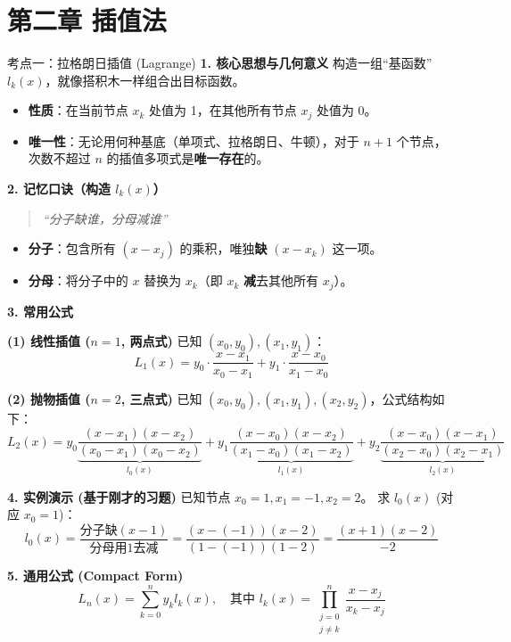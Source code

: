 \documentclass[12pt, a4paper]{article}
\begin{document}
\section*{第二章 插值法}
\begin{knowpoint}{考点一：拉格朗日插值 (Lagrange)}
    \textbf{1. 核心思想与几何意义}
    构造一组“基函数” $l_k(x)$，就像搭积木一样组合出目标函数。
    \begin{itemize}
        \item \textbf{性质}：在当前节点 $x_k$ 处值为 1，在其他所有节点 $x_j$ 处值为 0。
        \item \textbf{唯一性}：无论用何种基底（单项式、拉格朗日、牛顿），对于 $n+1$ 个节点，次数不超过 $n$ 的插值多项式是\textbf{唯一存在}的。
    \end{itemize}
    
    \textbf{2. 记忆口诀（构造 $l_k(x)$）}
    \begin{quote}
        \textit{“分子缺谁，分母减谁”}
    \end{quote}
    \begin{itemize}
        \item \textbf{分子}：包含所有 $(x - x_j)$ 的乘积，唯独\textbf{缺} $(x - x_k)$ 这一项。
        \item \textbf{分母}：将分子中的 $x$ 替换为 $x_k$（即 $x_k$ \textbf{减}去其他所有 $x_j$）。
    \end{itemize}
    
    \textbf{3. 常用公式}
    
    \textbf{(1) 线性插值 ($n=1$, 两点式)}
    已知 $(x_0, y_0), (x_1, y_1)$：
    \[ L_1(x) = y_0 \cdot \frac{x - x_1}{x_0 - x_1} + y_1 \cdot \frac{x - x_0}{x_1 - x_0} \]
    
    \textbf{(2) 抛物插值 ($n=2$, 三点式)}
    已知 $(x_0, y_0), (x_1, y_1), (x_2, y_2)$，公式结构如下：
    \[ 
    L_2(x) = y_0 \underbrace{\frac{(x-x_1)(x-x_2)}{(x_0-x_1)(x_0-x_2)}}_{l_0(x)} + 
             y_1 \underbrace{\frac{(x-x_0)(x-x_2)}{(x_1-x_0)(x_1-x_2)}}_{l_1(x)} + 
             y_2 \underbrace{\frac{(x-x_0)(x-x_1)}{(x_2-x_0)(x_2-x_1)}}_{l_2(x)}
    \]
    
    \textbf{4. 实例演示 (基于刚才的习题)}
    已知节点 $x_0=1, x_1=-1, x_2=2$。
    求 $l_0(x)$ (对应 $x_0=1$)：
    \[ 
    l_0(x) = \frac{\text{分子缺}(x-1)}{\text{分母用}1\text{去减}} = \frac{(x - (-1))(x - 2)}{(1 - (-1))(1 - 2)} = \frac{(x+1)(x-2)}{-2}
    \]
    
    \textbf{5. 通用公式 (Compact Form)}
    \[ L_n(x) = \sum_{k=0}^{n} y_k l_k(x), \quad \text{其中 } l_k(x) = \prod_{\substack{j=0 \\ j \neq k}}^{n} \frac{x - x_j}{x_k - x_j} \]
\end{knowpoint}
\end{document}
